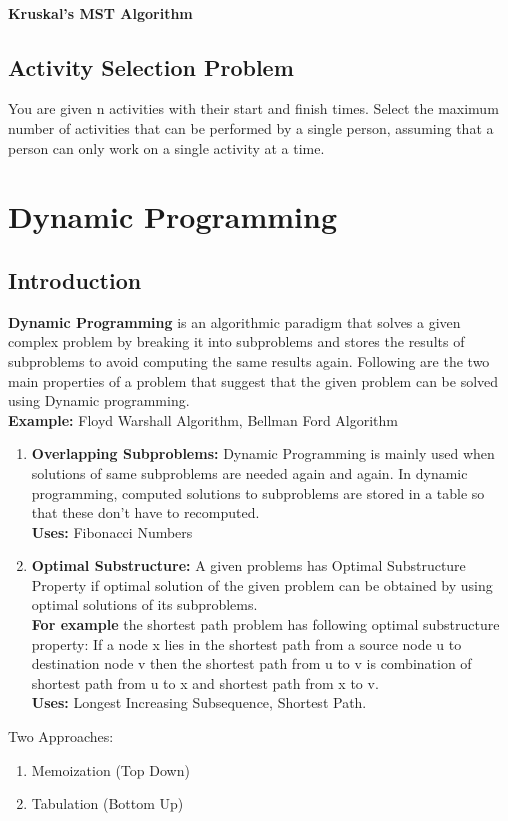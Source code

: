 \documentclass[a4paper,oneside]{book}
\begin{document}
\subsubsection{Kruskal's MST Algorithm}
\section{Activity Selection Problem}
\begin{definition}
You are given n activities with their start and finish times. Select the maximum number of activities that can be performed by a single person, assuming that a person can only work on a single activity at a time.
\end{definition}
\chapter{Dynamic Programming}
\section{Introduction}
\textbf{Dynamic Programming} is an algorithmic paradigm that solves a given complex problem by breaking it into subproblems and stores the results of subproblems to avoid computing the same results again. Following are the two main properties of a problem that suggest that the given problem can be solved using Dynamic programming.\\
\textbf{Example:} Floyd Warshall Algorithm, Bellman Ford Algorithm
\begin{enumerate}
\item \textbf{Overlapping Subproblems:}  Dynamic Programming is mainly used when solutions of same subproblems are needed again and again. In dynamic programming, computed solutions to subproblems are stored in a table so that these don’t have to recomputed. \\
\textbf{Uses:} Fibonacci Numbers
\item \textbf{Optimal Substructure:} A given problems has Optimal Substructure Property if optimal solution of the given problem can be obtained by using optimal solutions of its subproblems.\\
\textbf{For example} the shortest path problem has following optimal substructure property: If a node x lies in the shortest path from a source node u to destination node v then the shortest path from u to v is combination of shortest path from u to x and shortest path from x to v.\\
\textbf{Uses:} Longest Increasing Subsequence, Shortest Path.
\end{enumerate}
Two Approaches:
\begin{enumerate}
\item Memoization (Top Down)
\item Tabulation (Bottom Up)
\end{enumerate}
\end{document}
